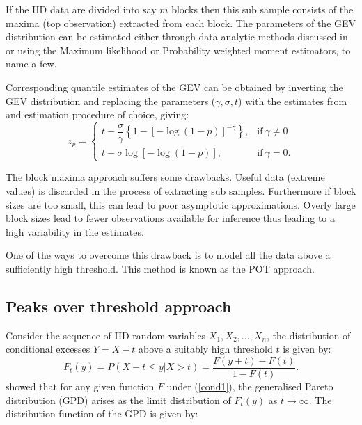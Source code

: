 If the IID data are divided into say $m$ blocks then this sub sample consists of the maxima (top observation) extracted from each block. The parameters of the GEV distribution can be estimated either through data analytic methods discussed in \cite{sts626} or using the Maximum likelihood or Probability weighted moment estimators, to name a few.

Corresponding quantile estimates of the GEV can be obtained by inverting the GEV distribution and replacing the parameters ($\gamma,\sigma,t$) with the estimates from and estimation procedure of choice, giving:
\begin{equation}
 z_{p} = 
\begin{cases}
 t - \dfrac{\sigma}{\gamma}\left\{1-[-\log(1-p)]^{-\gamma}\right\}, & \text{if}\ \gamma\neq0 \\
 t - \sigma\log[-\log(1-p)], & \text{if}\ \gamma=0.
\end{cases}
\end{equation}

The block maxima approach suffers some drawbacks. Useful data (extreme values) is discarded in the process of extracting sub samples. Furthermore if block sizes are too small, this can lead to poor asymptotic approximations. Overly large block sizes lead to fewer observations available for inference thus leading to a high variability in the estimates.

One of the ways to overcome this drawback is to model all the data above a sufficiently high threshold. This method is known as the POT approach.

\subsection{Peaks over threshold approach}\label{peaksoverthreshold}
Consider the sequence of IID random variables $X_1,X_2,...,X_n$, the distribution of conditional excesses $Y=X-t$ above a suitably high threshold $t$ is given by:
\begin{equation}\label{conditional}
F_t(y) = P(X-t\leq y|X>t) = \dfrac{F(y+t)-F(t)}{1-F(t)}.
\end{equation}\cite{pickands1975statistical} showed that for any given function $F$ under (\ref{cond1}), the generalised Pareto distribution (GPD) arises as the limit distribution of $F_t(y)$ as $t\rightarrow\infty$.
The distribution function of the GPD is given by:


